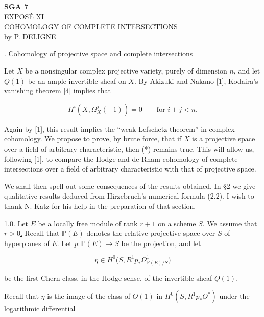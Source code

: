 \clearpage
\begin{center}
{\large\textbf{SGA 7}}\\[1.5em]
{\Large\underline{EXPOSÉ XI}}\\[2.5em]
{\Large\underline{\underline{COHOMOLOGY OF COMPLETE INTERSECTIONS}}}\\[1.5em]
{\large\underline{by P. DELIGNE}}
\end{center}

\bigskip
{}. \underline{Cohomology of projective space and complete
intersections}

Let $X$ be a nonsingular complex projective variety, purely of dimension $n$,
and let $\underline O(1)$ be an ample invertible sheaf on $X$.  By Akizuki and
Nakano [1], Kodaira's vanishing theorem [4] implies that

\begin{equation}\tag{*}
H^i(X,\Omega_X^j(-1))=0\qquad\text{for }i+j<n.
\end{equation}

Again by [1], this result implies the ``weak Lefschetz theorem'' in complex
cohomology.  We propose to prove, by brute force, that if $X$ is a projective
space over a field of arbitrary characteristic, then (*) remains true.  This
will allow us, following [1], to compare the Hodge and de Rham cohomology of
complete intersections over a field of arbitrary characteristic with that of
projective space.

We shall then spell out some consequences of the results obtained.  In §2 we
give qualitative results deduced from Hirzebruch's numerical formula (2.2).  I
wish to thank N. Katz for his help in the preparation of that section.

1.0. Let $\underline E$ be a locally free module of rank $r+1$ on a scheme
$S$.  \underline{We assume that $r>0$.}  Recall that
$\mathbb P(\underline E)$ denotes the relative projective space over $S$ of
hyperplanes of $\underline E$.  Let $p:\mathbb P(\underline E)\to S$ be the
projection, and let

\begin{equation*}
\eta\in H^0\bigl(S,R^1p_*\Omega^1_{\mathbb P(\underline E)/S}\bigr)
\end{equation*}

be the first Chern class, in the Hodge sense, of the invertible sheaf
$\underline O(1)$.


Recall that $\eta$ is the image of the class of $\underline O(1)$ in
$H^0(S,R^1p_*\underline O^*)$ under the logarithmic differential

